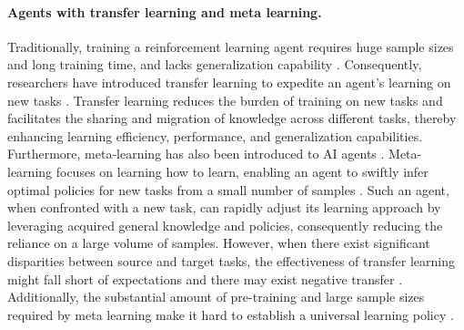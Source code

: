 \documentclass{article}
\begin{document}
\paragraph{Agents with transfer learning and meta learning.}
Traditionally, training a reinforcement learning agent requires huge sample sizes and long training time, and lacks generalization capability \cite{DBLP:journals/corr/abs-1810-00123,DBLP:journals/corr/abs-1804-06893,justesen2018illuminating,DBLP:journals/ml/Dulac-ArnoldLML21,DBLP:conf/nips/GhoshRKZAL21}. 
Consequently, researchers have introduced transfer learning to expedite an agent's learning on new tasks \cite{DBLP:conf/atal/BrysHTN15,parisotto2015actor,DBLP:journals/corr/abs-2009-07888}. 
Transfer learning reduces the burden of training on new tasks and facilitates the sharing and migration of knowledge across different tasks, thereby enhancing learning efficiency, performance, and generalization capabilities. Furthermore, meta-learning has also been introduced to AI agents \cite{DBLP:journals/corr/DuanSCBSA16,DBLP:conf/icml/FinnAL17,DBLP:conf/nips/GuptaMLAL18,DBLP:conf/icml/RakellyZFLQ19,fakoor2019meta}. 
Meta-learning focuses on learning how to learn, enabling an agent to swiftly infer optimal policies for new tasks from a small number of samples \cite{vanschoren2018meta}. 
Such an agent, when confronted with a new task, can rapidly adjust its learning approach by leveraging acquired general knowledge and policies, consequently reducing the reliance on a large volume of samples. 
However, when there exist significant disparities between source and target tasks, the effectiveness of transfer learning might fall short of expectations and there may exist negative transfer \cite{DBLP:journals/jmlr/TaylorS09,DBLP:conf/icml/TirinzoniSPR18}.
Additionally, the substantial amount of pre-training and large sample sizes required by meta learning make it hard to establish a universal learning policy \cite{DBLP:conf/icml/FinnAL17,DBLP:journals/corr/abs-2301-08028}.
\end{document}
